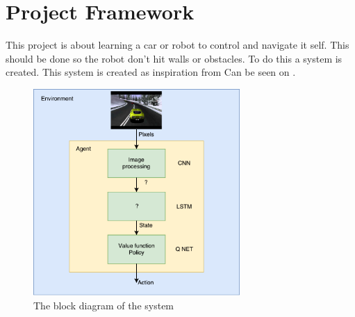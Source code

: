 \chapter{Project Framework}
\label{chap:projectdef}
This project is about learning a car or robot to control and navigate it self. This should be done so the robot don't hit walls or obstacles. To do this a system is created. This system is created as inspiration from  \cite{DBLP:journals/corr/MnihBMGLHSK16}
\newline
Can be seen on .

\begin{figure}[H]
	\centering
	\includegraphics[width=0.7\textwidth]{Figures/Project_definition_block_diagram}
	\caption{The block diagram of the system}
	\label{fig:Project_Definition}
\end{figure}


